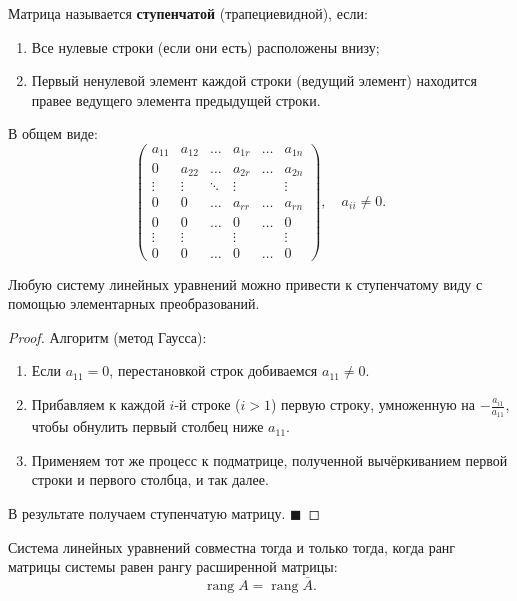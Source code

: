 \begin{definition}
Матрица называется \textbf{ступенчатой} (трапециевидной), если:
\begin{enumerate}
    \item Все нулевые строки (если они есть) расположены внизу;
    \item Первый ненулевой элемент каждой строки (ведущий элемент) находится правее ведущего элемента предыдущей строки.
\end{enumerate}
В общем виде:
\[
\begin{pmatrix}
a_{11} & a_{12} & \ldots & a_{1r} & \ldots & a_{1n} \\
0 & a_{22} & \ldots & a_{2r} & \ldots & a_{2n} \\
\vdots & \vdots & \ddots & \vdots & & \vdots \\
0 & 0 & \ldots & a_{rr} & \ldots & a_{rn} \\
0 & 0 & \ldots & 0 & \ldots & 0 \\
\vdots & \vdots & & \vdots & & \vdots \\
0 & 0 & \ldots & 0 & \ldots & 0
\end{pmatrix}, \quad a_{ii} \neq 0.
\]
\end{definition}

\begin{theorem}
Любую систему линейных уравнений можно привести к ступенчатому виду с помощью элементарных преобразований.
\end{theorem}

\begin{proof}
Алгоритм (метод Гаусса):
\begin{enumerate}
    \item Если $a_{11} = 0$, перестановкой строк добиваемся $a_{11} \neq 0$.
    \item Прибавляем к каждой $i$-й строке ($i > 1$) первую строку, умноженную на $-\frac{a_{i1}}{a_{11}}$, чтобы обнулить первый столбец ниже $a_{11}$.
    \item Применяем тот же процесс к подматрице, полученной вычёркиванием первой строки и первого столбца, и так далее.
\end{enumerate}
В результате получаем ступенчатую матрицу.
\hfill$\blacksquare$
\end{proof}

\begin{theorem}
Система линейных уравнений совместна тогда и только тогда, когда ранг матрицы системы равен рангу расширенной матрицы:
\[
\operatorname{rang} A = \operatorname{rang} \overline{A}.
\]
\end{theorem}

